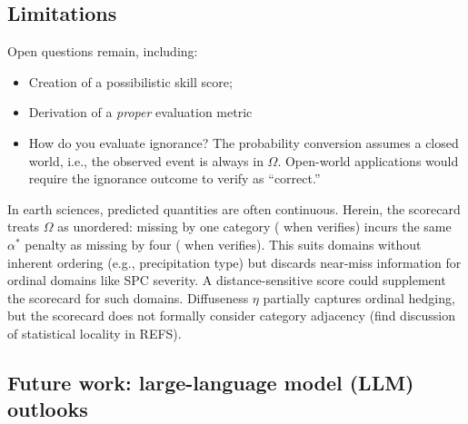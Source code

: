 
\subsection{Limitations}\label{sec:limitations}

Open questions remain, including:

\begin{itemize}
    \item Creation of a possibilistic skill score;
    \item Derivation of a \textit{proper} evaluation metric
    \item How do you evaluate ignorance?
    The probability conversion assumes a closed
    world, i.e., the observed event is always
    in $\Omega$.
    Open-world applications would require the
    ignorance outcome to verify as ``correct.''
\end{itemize}

In earth sciences, predicted quantities are often
continuous. Herein, the scorecard treats $\Omega$
as unordered: missing by one category
( when  verifies) incurs the same $\alpha^*$ penalty
as missing by four ( when  verifies). This suits
domains without inherent ordering (e.g., precipitation type) but
discards near-miss information for ordinal domains like SPC severity.
A distance-sensitive score could supplement the scorecard for such
domains. Diffuseness $\eta$ partially captures ordinal hedging, but the
scorecard does not formally consider category
adjacency (find discussion of statistical
locality in REFS).

\subsection{Future work: large-language model
(LLM) outlooks}\label{sec:future_directions}

